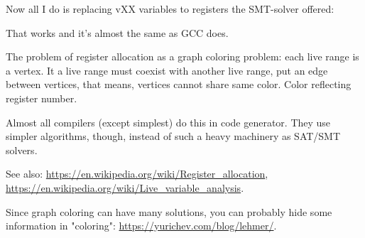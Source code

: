 Now all I do is replacing vXX variables to registers the SMT-solver offered:



That works and it's almost the same as GCC does.

The problem of register allocation as a graph coloring problem: each live range is a vertex.
It a live range must coexist with another live range, put an edge between vertices, that means, vertices cannot share same color.
Color reflecting register number.

Almost all compilers (except simplest) do this in code generator. They use simpler algorithms, though, instead of such a heavy machinery as SAT/SMT solvers.

See also: \url{https://en.wikipedia.org/wiki/Register_allocation}, \url{https://en.wikipedia.org/wiki/Live_variable_analysis}.

Since graph coloring can have many solutions, you can probably hide some information
in "coloring": \url{https://yurichev.com/blog/lehmer/}.

